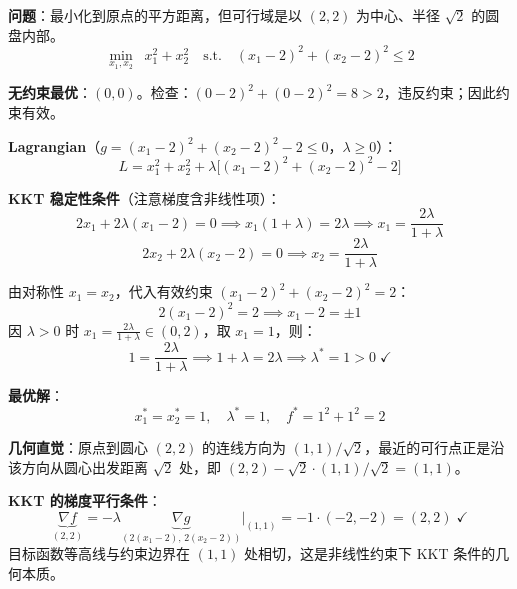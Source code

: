 \documentclass[12pt, a4paper]{ctexart}
\begin{document}
\begin{blackboard}

\textbf{问题}：最小化到原点的平方距离，但可行域是以 $(2,2)$ 为中心、半径 $\sqrt{2}$ 的圆盘内部。
\[
\min_{x_1,x_2} \;\; x_1^2 + x_2^2 \quad \text{s.t.} \quad (x_1-2)^2 + (x_2-2)^2 \leq 2
\]

\textbf{无约束最优}：$(0,0)$。检查：$(0-2)^2+(0-2)^2=8 > 2$，违反约束；因此约束有效。

\textbf{Lagrangian}（$g = (x_1-2)^2+(x_2-2)^2-2 \leq 0$，$\lambda \geq 0$）：
\[
L = x_1^2 + x_2^2 + \lambda\bigl[(x_1-2)^2 + (x_2-2)^2 - 2\bigr]
\]

\textbf{KKT 稳定性条件}（注意梯度含非线性项）：
\[
2x_1 + 2\lambda(x_1 - 2) = 0 \implies x_1(1+\lambda) = 2\lambda \implies x_1 = \frac{2\lambda}{1+\lambda}
\]
\[
2x_2 + 2\lambda(x_2 - 2) = 0 \implies x_2 = \frac{2\lambda}{1+\lambda}
\]

由对称性 $x_1 = x_2$，代入有效约束 $(x_1-2)^2+(x_2-2)^2=2$：
\[
2(x_1-2)^2 = 2 \implies x_1 - 2 = \pm 1
\]
因 $\lambda > 0$ 时 $x_1 = \frac{2\lambda}{1+\lambda} \in (0, 2)$，取 $x_1 = 1$，则：
\[
1 = \frac{2\lambda}{1+\lambda} \implies 1 + \lambda = 2\lambda \implies \lambda^* = 1 > 0 \;\checkmark
\]

\textbf{最优解}：
\[
x_1^* = x_2^* = 1, \quad \lambda^* = 1, \quad f^* = 1^2 + 1^2 = 2
\]

\textbf{几何直觉}：原点到圆心 $(2,2)$ 的连线方向为 $(1,1)/\sqrt{2}$，最近的可行点正是沿该方向从圆心出发距离 $\sqrt{2}$ 处，即 $(2,2)-\sqrt{2}\cdot(1,1)/\sqrt{2} = (1,1)$。

\textbf{KKT 的梯度平行条件}：
\[
\underbrace{\nabla f}_{(2,2)} = -\lambda \underbrace{\nabla g}_{(2(x_1-2),\,2(x_2-2))} \Big|_{(1,1)} = -1 \cdot (-2,-2) = (2,2) \;\checkmark
\]
目标函数等高线与约束边界在 $(1,1)$ 处相切，这是非线性约束下 KKT 条件的几何本质。

\end{blackboard}
\end{document}
